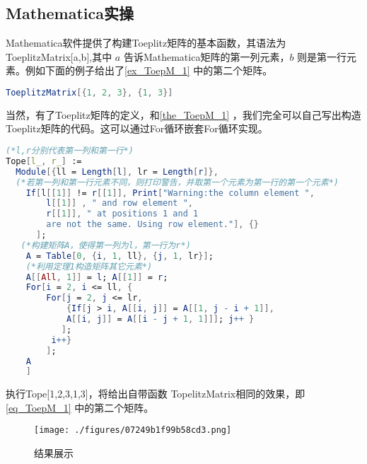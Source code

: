 \subsection{Mathematica实操}
Mathematica软件提供了构建Toeplitz矩阵的基本函数，其语法为 ToeplitzMatrix[a,b],其中 $a$ 告诉Mathematica矩阵的第一列元素，$b$ 则是第一行元素。例如下面的例子给出了\autoref{ex_ToepM_1} 中的第二个矩阵。
\begin{lstlisting}[language=mathematica, caption=Mathematica构造Toeplitz矩阵]
ToeplitzMatrix[{1, 2, 3}, {1, 3}]
\end{lstlisting}
当然，有了Toeplitz矩阵的定义，和\autoref{the_ToepM_1} ，我们完全可以自己写出构造Toeplitz矩阵的代码。这可以通过For循环嵌套For循环实现。
\begin{lstlisting}[language=mathematica, caption=Mathematica自写Toeplitz矩阵代码]
(*l,r分别代表第一列和第一行*)
Tope[l_, r_] := 
  Module[{ll = Length[l], lr = Length[r]},
  (*若第一列和第一行元素不同，则打印警告，并取第一个元素为第一行的第一个元素*)
    If[l[[1]] != r[[1]], Print["Warning:the column element ",
        l[[1]] , " and row element ", 
        r[[1]], " at positions 1 and 1
        are not the same. Using row element."], {}
      ];
   (*构建矩阵A，使得第一列为l，第一行为r*)
    A = Table[0, {i, 1, ll}, {j, 1, lr}];
    (*利用定理1构造矩阵其它元素*)
    A[[All, 1]] = l; A[[1]] = r;
    For[i = 2, i <= ll, {
        For[j = 2, j <= lr,
            {If[j > i, A[[i, j]] = A[[1, j - i + 1]], 
            A[[i, j]] = A[[i - j + 1, 1]]]; j++ } 
           ];
         i++}
        ];
    A
    ]
\end{lstlisting}
执行Tope[{1,2,3},{1,3}]，将给出自带函数 TopelitzMatrix相同的效果，即\autoref{eq_ToepM_1} 中的第二个矩阵。\begin{figure}[ht]
\centering
\texttt{[image: ./figures/07249b1f99b58cd3.png]}
\caption{结果展示} \label{fig_ToepM_2}
\end{figure}

